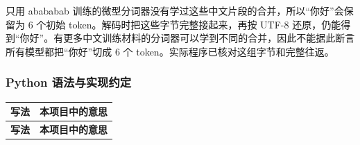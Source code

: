 \documentclass[11pt,a4paper]{article}
\newlength{\BpeDocTableWidth}
\newcommand{\BpeDocCodeInline}[1]{{\ttfamily #1}}
\newcommand{\BpeDocSubsubsection}[2]{\subsubsection{\texorpdfstring{#1}{#2}}}
\begin{document}
只用 abababab 训练的微型分词器没有学过这些中文片段的合并，所以“你好”会保留为 6 个初始 \BpeDocCodeInline{token}。解码时把这些字节完整接起来，再按 UTF-8 还原，仍能得到“你好”。有更多中文训练材料的分词器可以学到不同的合并，因此不能据此断言所有模型都把“你好”切成 6 个 \BpeDocCodeInline{token}。实际程序已核对这组字节和完整往返。


\BpeDocSubsubsection{Python 语法与实现约定}{Python 语法与实现约定}


\begingroup\fontsize{9.3}{12.7}\selectfont{}
\setlength{\BpeDocTableWidth}{\dimexpr\linewidth-4\tabcolsep\relax}
\renewcommand{\arraystretch}{1.15}
\begin{longtable}{>{\raggedright\arraybackslash}p{0.290000\BpeDocTableWidth}>{\raggedright\arraybackslash}p{0.710000\BpeDocTableWidth}}
\toprule
\textbf{写法} & \textbf{本项目中的意思} \\

\midrule\endfirsthead
\toprule
\textbf{写法} & \textbf{本项目中的意思} \\


\end{longtable}
\end{document}
